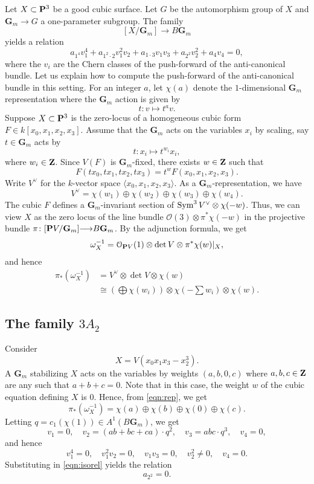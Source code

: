 \documentclass[12pt,reqno]{amsart}
\renewcommand{\to}{{\longrightarrow}}
\numberwithin{equation}{section}
\renewcommand{\O}{\mathcal O}
\newcommand{\G}{\mathbf G}
\begin{document}
Let $X \subset \P^3$ be a good cubic surface.
Let $G$ be the automorphism group of $X$ and $\G_m \to G$ a one-parameter subgroup.
The family
\[ [X/\G_m] \to B\G_m\]
yields a relation
\begin{equation}\label{eqn:isorel}
  a_{1^4}v_1^4 + a_{1^2\cdot 2} v_1^2v_2 + a_{1\cdot 3} v_1v_3 + a_{2^2}v_2^2 + a_4 v_4 = 0,
\end{equation}
where the $v_i$ are the Chern classes of the push-forward of the anti-canonical bundle.
Let us explain how to compute the push-forward of the anti-canonical bundle in this setting.
For an integer $a$, let $\chi(a)$ denote the $1$-dimensional $\G_m$ representation where the $\G_m$ action is given by
\[ t \colon v \mapsto t^a v.\]
Suppose $X \subset \P^3$ is the zero-locus of a homogeneous cubic form $F \in k[x_0,x_1,x_2,x_3]$.
Assume that the $\G_m$ acts on the variables $x_i$ by scaling, say $t \in \G_m$ acts by
\[ t \colon x_i \mapsto t^{w_i}x_i,\]
where $w_i \in \Z$.
Since $V(F)$ is $\G_m$-fixed, there exists $w \in \Z$ such that
\[ F \left(t x_0, t x_1, t x_2, t x_3\right) = t^w F\left(x_0, x_1, x_2,x_3\right).\]
Write $V^\vee$ for the $k$-vector space $\langle x_0, x_1, x_2,x_3 \rangle$.
As a $\G_m$-representation, we have
\[ V^\vee = \chi(w_1) \oplus \chi(w_2) \oplus \chi(w_3) \oplus \chi(w_4).\]
The cubic $F$ defines a $\G_m$-invariant section of $\Sym^3 V^\vee \otimes \chi(-w)$.
Thus, we can view $X$ as the zero locus of the line bundle $\O(3) \otimes \pi^*\chi(-w)$ in the projective bundle $\pi \colon [\P V/\G_m] \to B\G_m$.
By the adjunction formula, we get
\[ \omega_X^{-1} = \O_{\P V}(1) \otimes \det V \otimes \pi^*\chi(w) |_X,\]
and hence
\begin{equation}\label{eqn:rep}
\begin{split}
  \pi_*\left( \omega_X^{-1} \right) &= V^\vee \otimes \det V \otimes \chi(w) \\
  &\cong \left( \bigoplus \chi(w_i)  \right) \otimes \chi\left(-\sum w_i\right) \otimes \chi(w).
\end{split}
\end{equation}

\subsection{The family $3A_2$}
Consider
\[ X = V(x_0x_1x_3 - x_2^3).\]
A $\G_m$ stabilizing $X$ acts on the variables by weights $(a,b,0,c)$ where $a,b,c \in \Z$ are any such that $a+b+c = 0$.
Note that in this case, the weight $w$ of the cubic equation defining $X$ is $0$.
Hence, from \eqref{eqn:rep}, we get
\[ \pi_*\left(\omega^{-1}_X\right) = \chi(a) \oplus \chi(b) \oplus \chi(0) \oplus \chi(c).\]
Letting $q = c_1(\chi(1)) \in A^1(B\G_m)$, we get
\[ v_1 = 0, \quad v_2 = (ab+bc+ca) \cdot q^2, \quad v_3 = abc \cdot q^3, \quad v_4 = 0,\]
and hence
\[ v_1^4 = 0, \quad v_1^2v_2 = 0, \quad v_1v_3 = 0,\quad v_2^2 \neq 0, \quad v_4 = 0.\]
Substituting in \eqref{eqn:isorel} yields the relation
\begin{equation}\label{eqn:iso1}
  a_{2^2} = 0.
\end{equation}
\end{document}
